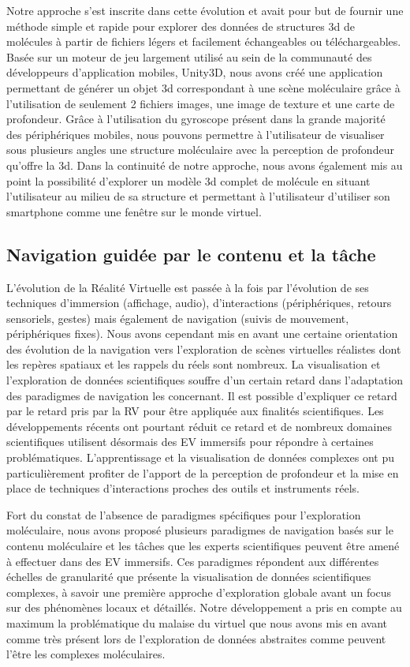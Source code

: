 Notre approche s'est inscrite dans cette évolution et avait pour but de fournir une méthode simple et rapide pour explorer des données de structures 3d de molécules à partir de fichiers légers et facilement échangeables ou téléchargeables. Basée sur un moteur de jeu largement utilisé au sein de la communauté des développeurs d'application mobiles, Unity3D, nous avons créé une application permettant de générer un objet 3d correspondant à une scène moléculaire grâce à l'utilisation de seulement 2 fichiers images, une image de texture et une carte de profondeur. Grâce à l'utilisation du gyroscope présent dans la grande majorité des périphériques mobiles, nous pouvons permettre à l'utilisateur de visualiser sous plusieurs angles une structure moléculaire avec la perception de profondeur qu'offre la 3d.
Dans la continuité de notre approche, nous avons également mis au point la possibilité d'explorer un modèle 3d complet de molécule en situant l'utilisateur au milieu de sa structure et permettant à l'utilisateur d'utiliser son smartphone comme une fenêtre sur le monde virtuel.

\subsection*{Navigation guidée par le contenu et la tâche}

L'évolution de la Réalité Virtuelle est passée à la fois par l'évolution de ses techniques d'immersion (affichage, audio), d'interactions (périphériques, retours sensoriels, gestes) mais également de navigation (suivis de mouvement, périphériques fixes). 
Nous avons cependant mis en avant une certaine orientation des évolution de la navigation vers l'exploration de scènes virtuelles réalistes dont les repères spatiaux et les rappels du réels sont nombreux. La visualisation et l'exploration de données scientifiques souffre d'un certain retard dans l'adaptation des paradigmes de navigation les concernant. Il est possible d'expliquer ce retard par le retard pris par la RV pour être appliquée aux finalités scientifiques. Les développements récents ont pourtant réduit ce retard et de nombreux domaines scientifiques utilisent désormais des EV immersifs pour répondre à certaines problématiques. L'apprentissage et la visualisation de données complexes ont pu particulièrement profiter de l'apport de la perception de profondeur et la mise en place de techniques d'interactions proches des outils et instruments réels.

Fort du constat de l'absence de paradigmes spécifiques pour l'exploration moléculaire, nous avons proposé plusieurs paradigmes de navigation basés sur le contenu moléculaire et les tâches que les experts scientifiques peuvent être amené à effectuer dans des EV immersifs. Ces paradigmes répondent aux différentes échelles de granularité que présente la visualisation de données scientifiques complexes, à savoir une première approche d'exploration globale avant un focus sur des phénomènes locaux et détaillés. Notre développement a pris en compte au maximum la problématique du malaise du virtuel que nous avons mis en avant comme très présent lors de l'exploration de données abstraites comme peuvent l'être les complexes moléculaires.

